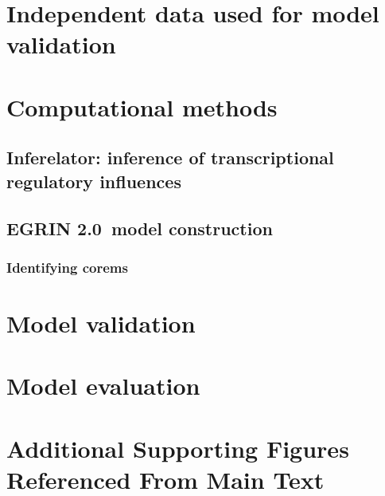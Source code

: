 \documentclass[11pt]{article}
\newcommand{\tmsamp}[1]{\textsf{#1}}
\newcommand{\nwinf}{{\tmsamp{Inferelator}}}
\newcommand{\egrine}{{\tmsamp{EGRIN 2.0}}}
\begin{document}


\section{Independent data used for model validation}



\section{Computational methods}



\subsection{\nwinf: inference of transcriptional regulatory influences}



\subsection{\egrine~model construction}



\subsubsection{Identifying corems}





\section{Model validation}\label{sec:validation}



\section{Model evaluation}\label{sec:evaluation}



\section{Additional Supporting Figures Referenced From Main Text}

\label{suppfigs}


\clearpage %

{}
\end{document}
